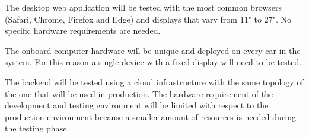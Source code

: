 The desktop web application will be tested with the most common browsers (Safari, Chrome, Firefox and Edge) and displays that vary from 11" to 27". No specific hardware requirements are needed.

The onboard computer hardware will be unique and deployed on every car in the system. For this reason a single device with a fixed display will need to be tested.

The backend will be tested using a cloud infrastructure with the same topology of the one that will be used in production. The hardware requirement of the development and testing environment will be limited with respect to the production environment because a smaller amount of resources is needed during the testing phase.

